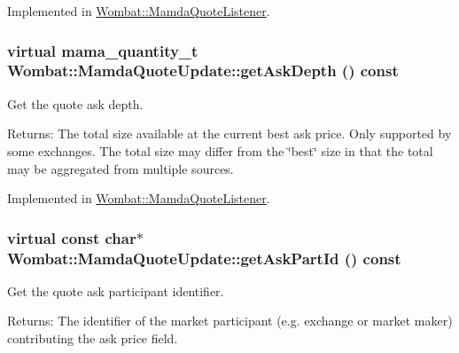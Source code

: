 Implemented in \hyperlink{classWombat_1_1MamdaQuoteListener_4808439461507148c55e678a3dffbb5d}{Wombat::Mamda\-Quote\-Listener}.\hypertarget{classWombat_1_1MamdaQuoteUpdate_4728d3b913b7a8709feeb6863de56186}{
\subsubsection[getAskDepth]{\setlength{\rightskip}{0pt plus 5cm}virtual mama\_\-quantity\_\-t Wombat::Mamda\-Quote\-Update::get\-Ask\-Depth () const}}
\label{classWombat_1_1MamdaQuoteUpdate_4728d3b913b7a8709feeb6863de56186}


Get the quote ask depth. 

\begin{Desc}
\item[Returns:]The total size available at the current best ask price. Only supported by some exchanges. The total size may differ from the \char`\"{}best\char`\"{} size in that the total may be aggregated from multiple sources. \end{Desc}


Implemented in \hyperlink{classWombat_1_1MamdaQuoteListener_4bc38582299115bc9d45411e4fabc76d}{Wombat::Mamda\-Quote\-Listener}.\hypertarget{classWombat_1_1MamdaQuoteUpdate_b1839344e3f8fa1339bffc169ed0fb2f}{
\subsubsection[getAskPartId]{\setlength{\rightskip}{0pt plus 5cm}virtual const char$\ast$ Wombat::Mamda\-Quote\-Update::get\-Ask\-Part\-Id () const}}
\label{classWombat_1_1MamdaQuoteUpdate_b1839344e3f8fa1339bffc169ed0fb2f}


Get the quote ask participant identifier. 

\begin{Desc}
\item[Returns:]The identifier of the market participant (e.g. exchange or market maker) contributing the ask price field. \end{Desc}


